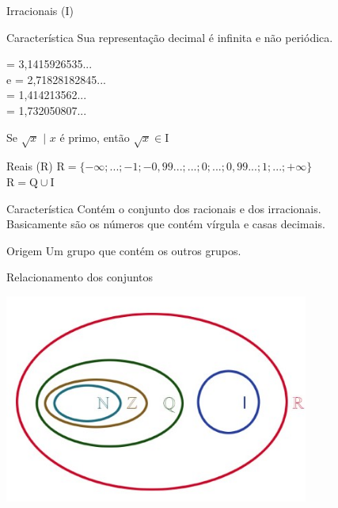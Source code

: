 \documentclass{beamer}
\begin{document}
    \begin{frame}{Irracionais ($\mathrm{I}$)}
        \begin{block}{Característica}
            Sua representação decimal é infinita e não periódica.
        \end{block}
        \begin{examples}
            \pi = 3,1415926535...\\
            e = 2,71828182845...\\
             = 1,414213562...\\
             = 1,732050807...\\
        \end{examples}
        \begin{alertblock}{}
            Se $\sqrt{x}$  $|$ $x$ é primo, então $\sqrt{x} \in \mathrm{I}$
        \end{alertblock}
    \end{frame}
    
    \begin{frame}{Reais ($\mathrm{R}$)}
        $\mathrm{R} = \{-\infty; ...; -1; -0,99...; ...; 0; ...; 0,99...; 1; ...; +\infty\}$\\
        $\mathrm{R} = \mathrm{Q} \cup \mathrm{I}$
        \newline
        \begin{block}{Característica}
            Contém o conjunto dos racionais e dos irracionais.\\ Basicamente são os números que contém vírgula e casas decimais.
        \end{block}
        \begin{block}{Origem}
            Um grupo que contém os outros grupos.
        \end{block}
    \end{frame}
    
    \begin{frame}{Relacionamento dos conjuntos}
        \begin{center}
            \includegraphics[width=10cm]{imagens/relação.jpg}
        \end{center}
        \begin{center}
            
        \end{center}
    \end{frame}
    
\end{document}
